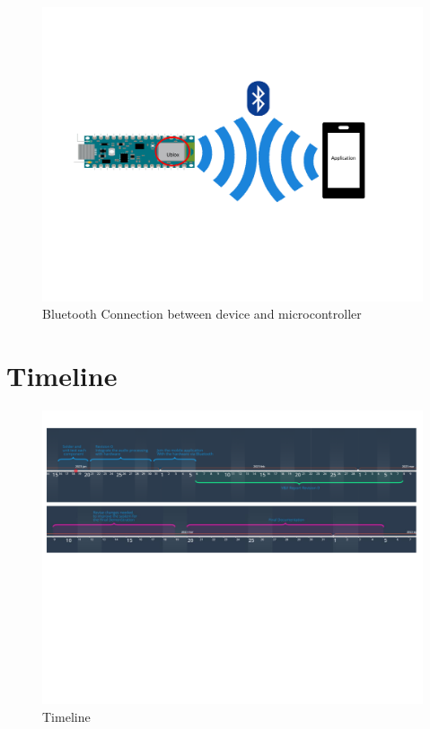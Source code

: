 \documentclass[12pt, titlepage]{article}
\begin{document}
\begin{figure}[H]
  \vspace*{-2cm}
  \includegraphics[width=\textwidth,height=\textheight,keepaspectratio]{BluetoothConnection.pdf}
  \vspace*{-4cm}
  \caption{Bluetooth Connection between device and microcontroller}
  \label{Bluetooth Connection} 
\end{figure}

\section{Timeline}

\begin{figure}[H]
  \includegraphics[clip,trim= 0cm 10cm 0cm 2cm,width=\textwidth,height=\textheight,keepaspectratio]{Timeline.pdf}
  \caption{Timeline}
  \label{Timeline} 
\end{figure}
\end{document}
